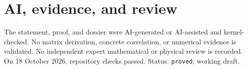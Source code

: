 \documentclass[11pt]{article}
\begin{document}
\section{AI, evidence, and review}
The statement, proof, and dossier were AI-generated or AI-assisted and kernel-checked.
No matrix derivation, concrete correlation, or numerical evidence is validated. No
independent expert mathematical or physical review is recorded. On 18 October 2026,
repository checks passed. Status: \texttt{proved}; working draft.
\end{document}
